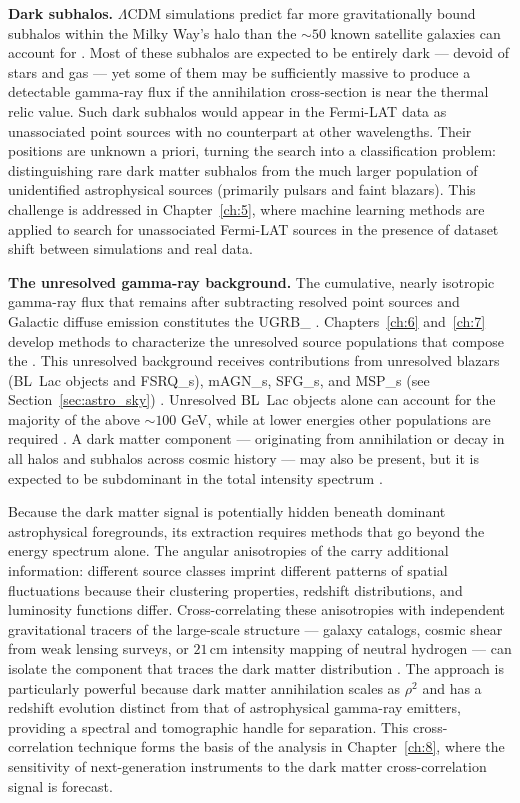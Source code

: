 \textbf{Dark subhalos.} $\Lambda$CDM simulations predict far more gravitationally bound subhalos within the Milky Way's halo than the $\sim 50$ known satellite galaxies can account for \cite{Springel:2008cc,Bullock:2017xww}.
Most of these subhalos are expected to be entirely dark --- devoid of stars and gas --- yet some of them may be sufficiently massive to produce a detectable gamma-ray flux if the annihilation cross-section is near the thermal relic value.
Such dark subhalos would appear in the Fermi-LAT data as unassociated point sources with no counterpart at other wavelengths.
Their positions are unknown a priori, turning the search into a classification problem: distinguishing rare dark matter subhalos from the much larger population of unidentified astrophysical sources (primarily pulsars and faint blazars).
This challenge is addressed in Chapter~\ref{ch:5}, where machine learning methods are applied to search for unassociated Fermi-LAT sources in the presence of dataset shift between simulations and real data.

\textbf{The unresolved gamma-ray background.}
The cumulative, nearly isotropic gamma-ray flux that remains after subtracting resolved point sources and Galactic diffuse emission constitutes the \gls{UGRB_} \cite{DGRB-review}.
Chapters~\ref{ch:6} and~\ref{ch:7} develop methods to characterize the unresolved source populations that compose the \UGRB.
This unresolved background receives contributions from unresolved blazars (BL~Lac objects and \glspl{FSRQ_}), \glspl{mAGN_}, \glspl{SFG_}, and \glspl{MSP_} (see Section~\ref{sec:astro_sky}) \cite{DGRB-review}.
Unresolved BL~Lac objects alone can account for the majority of the \UGRB above $\sim 100$ GeV, while at lower energies other populations are required \cite{DGRB-review}.
A dark matter component --- originating from annihilation or decay in all halos and subhalos across cosmic history --- may also be present, but it is expected to be subdominant in the total intensity spectrum \cite{DGRB-review}.

Because the dark matter signal is potentially hidden beneath dominant astrophysical foregrounds, its extraction requires methods that go beyond the energy spectrum alone.
The angular anisotropies of the \UGRB carry additional information: different source classes imprint different patterns of spatial fluctuations because their clustering properties, redshift distributions, and luminosity functions differ.
Cross-correlating these anisotropies with independent gravitational tracers of the large-scale structure --- galaxy catalogs, cosmic shear from weak lensing surveys, or $21\,$cm intensity mapping of neutral hydrogen --- can isolate the component that traces the dark matter distribution \cite{DGRB-review,Pinetti:2021jjs}.
The approach is particularly powerful because dark matter annihilation scales as $\rho^2$ and has a redshift evolution distinct from that of astrophysical gamma-ray emitters, providing a spectral and tomographic handle for separation.
This cross-correlation technique forms the basis of the analysis in Chapter~\ref{ch:8}, where the sensitivity of next-generation instruments to the dark matter cross-correlation signal is forecast.

